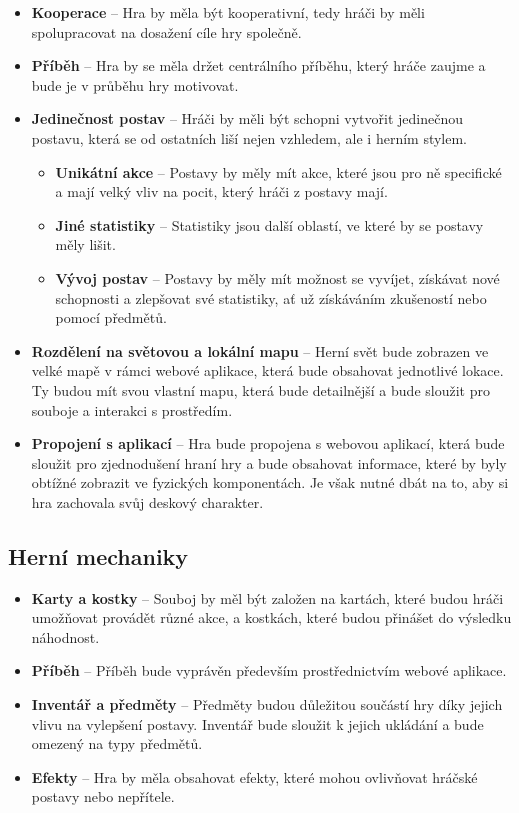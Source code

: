 \begin{itemize}
    \item \textbf{Kooperace} -- 
        Hra by měla být kooperativní, tedy hráči by měli spolupracovat na dosažení cíle hry společně.
    \item \textbf{Příběh} -- 
        Hra by se měla držet centrálního příběhu, který hráče zaujme a bude je v průběhu hry motivovat.
    \item \textbf{Jedinečnost postav} -- 
        Hráči by měli být schopni vytvořit jedinečnou postavu, která se od ostatních liší nejen vzhledem, ale i herním stylem.

    \begin{itemize}
        \item \textbf{Unikátní akce} -- 
            Postavy by měly mít akce, které jsou pro ně specifické a mají velký vliv na pocit, který hráči z postavy mají.
        \item \textbf{Jiné statistiky} -- 
            Statistiky jsou další oblastí, ve které by se postavy měly lišit.
        \item \textbf{Vývoj postav} -- 
            Postavy by měly mít možnost se vyvíjet, získávat nové schopnosti a zlepšovat své statistiky, ať už získáváním zkušeností nebo pomocí předmětů.
    \end{itemize}

    \item \textbf{Rozdělení na světovou a lokální mapu} -- 
        Herní svět bude zobrazen ve velké mapě v rámci webové aplikace, která bude obsahovat jednotlivé lokace. Ty budou mít svou vlastní mapu, která bude detailnější a bude sloužit pro souboje a interakci s prostředím.
    \item \textbf{Propojení s aplikací} -- 
        Hra bude propojena s webovou aplikací, která bude sloužit pro zjednodušení hraní hry a bude obsahovat informace, které by byly obtížné zobrazit ve fyzických komponentách. Je však nutné dbát na to, aby si hra zachovala svůj deskový charakter.
\end{itemize}

\subsection*{Herní mechaniky}
\label{subsec:req_mechanics}

\begin{itemize}
    \item \textbf{Karty a kostky} -- 
        Souboj by měl být založen na kartách, které budou hráči umožňovat provádět různé akce, a kostkách, které budou přinášet do výsledku náhodnost.
    \item \textbf{Příběh} -- 
        Příběh bude vyprávěn především prostřednictvím webové aplikace.
    \item \textbf{Inventář a předměty} -- 
        Předměty budou důležitou součástí hry díky jejich vlivu na vylepšení postavy. Inventář bude sloužit k jejich ukládání a bude omezený na typy předmětů.
    \item \textbf{Efekty} -- 
        Hra by měla obsahovat efekty, které mohou ovlivňovat hráčské postavy nebo nepřítele.
\end{itemize}

